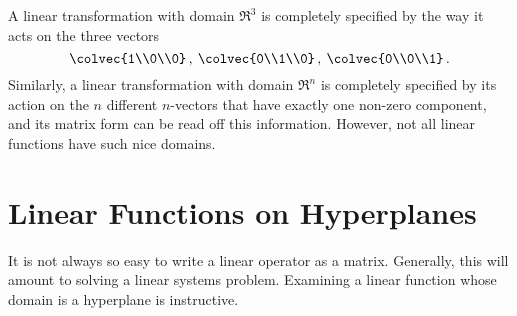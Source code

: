 A linear transformation with domain $\Re^3$ is completely specified by the way it acts on the three vectors 
$$
\colvec{1\\0\\0}\, ,\:\colvec{0\\1\\0}\, ,\:\colvec{0\\0\\1}\, .
$$
Similarly, a linear transformation with domain $\Re^n$ is completely specified by its action on the $n$ different $n$-vectors that have exactly one non-zero component, and its matrix form can be read off this information. However, not all linear functions have such nice domains.



\section{Linear Functions on Hyperplanes }
It is not always so easy to write a linear operator as a matrix. 
Generally, this will amount to solving a linear systems problem. Examining a linear function whose domain is a hyperplane is instructive.

